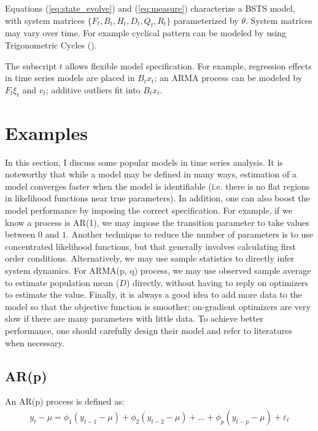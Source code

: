 \documentclass[10pt, titlepage]{article}
\numberwithin{equation}{section}
\begin{document}
Equations (\ref{eq:state_evolve}) and (\ref{eq:measure}) characterize a BSTS model, with system matrices $\{F_t, B_t, H_t, D_t, Q_t, R_t\}$ parameterized by $\theta$. System matrices may vary over time. For example cyclical pattern can be modeled by using Trigonometric Cycles (\cite{harvey_1985}). 

The subscript $t$ allows flexible model specification. For example, regression effects in time series models are placed in $B_t x_t$; an ARMA process can be modeled by $F_t\xi_t$ and $v_t$; additive outliers fit into $B_t x_t$.

\section{Examples} \label{sec:apply}
In this section, I discuss some popular models in time series analysis. It is noteworthy that while a model may be defined in many ways, estimation of a model converges faster when the model is identifiable (i.e. there is no flat regions in likelihood functions near true parameters). In addition, one can also boost the model performance by imposing the correct specification. For example, if we know a process is AR(1), we may impose the transition parameter to take values between $0$ and $1$. Another technique to reduce the number of parameters is to use concentrated likelihood functions, but that generally involves calculating first order conditions. Alternatively, we may use sample statistics to directly infer system dynamics. For ARMA(p, q) process, we may use observed sample average to estimate population mean ($D$) directly, without having to reply on optimizers to estimate the value. Finally, it is always a good idea to add more data to the model so that the objective function is smoother; on-gradient optimizers are very slow if there are many parameters with little data. To achieve better performance, one should carefully design their model and refer to literatures when necessary.

\subsection{AR(p)}
An AR(p) process is defined as:
\begin{align*}
    y_t-\mu = \phi_1(y_{t-1}-\mu) + \phi_2(y_{t-2}-\mu) + ... + \phi_p(y_{t-p}-\mu) + \varepsilon_t
\end{align*}
\end{document}
